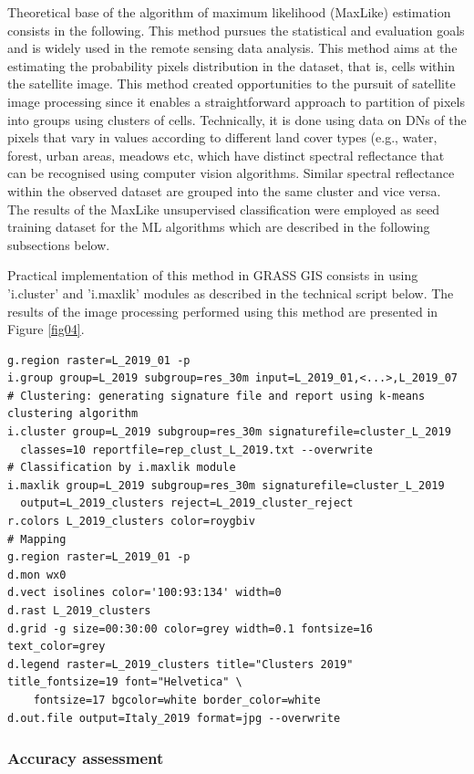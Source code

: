 \documentclass[preprint,12pt,authoryear]{elsarticle}
\begin{document}
Theoretical base of the algorithm of maximum likelihood (MaxLike) estimation consists in the following. This method pursues the statistical and evaluation goals and is widely used in the remote sensing data analysis. This method aims at the estimating the probability pixels distribution in the dataset, that is, cells within the satellite image. This method  created opportunities to the pursuit of satellite image processing since it enables a straightforward approach to partition of pixels into groups using clusters of cells. Technically, it is done using data on DNs of the pixels that vary in values according to different land cover types (e.g., water, forest, urban areas, meadows etc, which have distinct spectral reflectance that can be recognised using computer vision algorithms. Similar spectral reflectance within the observed dataset are grouped into the same cluster and vice versa. The results of the MaxLike unsupervised classification were employed as seed training dataset for the ML algorithms which are described in the following subsections below.

Practical implementation of this method in GRASS GIS consists in using 'i.cluster' and 'i.maxlik' modules as described in the technical script below. The results of the image processing performed using this method are presented in Figure \ref{fig04}. 

\begin{footnotesize}
\begin{verbatim}
g.region raster=L_2019_01 -p
i.group group=L_2019 subgroup=res_30m input=L_2019_01,<...>,L_2019_07
# Clustering: generating signature file and report using k-means clustering algorithm
i.cluster group=L_2019 subgroup=res_30m signaturefile=cluster_L_2019 
  classes=10 reportfile=rep_clust_L_2019.txt --overwrite
# Classification by i.maxlik module
i.maxlik group=L_2019 subgroup=res_30m signaturefile=cluster_L_2019
  output=L_2019_clusters reject=L_2019_cluster_reject
r.colors L_2019_clusters color=roygbiv
# Mapping
g.region raster=L_2019_01 -p
d.mon wx0
d.vect isolines color='100:93:134' width=0
d.rast L_2019_clusters
d.grid -g size=00:30:00 color=grey width=0.1 fontsize=16 text_color=grey
d.legend raster=L_2019_clusters title="Clusters 2019" title_fontsize=19 font="Helvetica" \
	fontsize=17 bgcolor=white border_color=white
d.out.file output=Italy_2019 format=jpg --overwrite
\end{verbatim}
\end{footnotesize}

\subsubsection{Accuracy assessment}
\end{document}
